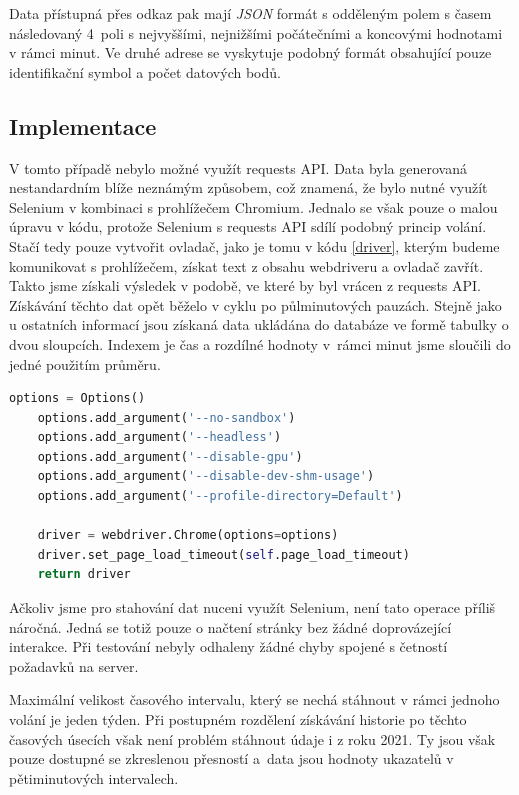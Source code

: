 Data přístupná přes odkaz pak mají \textit{JSON} formát s odděleným polem s časem následovaný 4~poli s nejvyššími, nejnižšími počátečními a koncovými hodnotami v rámci minut. 
Ve druhé adrese se vyskytuje podobný formát obsahující pouze identifikační symbol a počet datových bodů.

\subsection{Implementace}

V tomto případě nebylo možné využít requests API. 
Data byla generovaná nestandardním blíže neznámým způsobem, což znamená, že bylo nutné využít Selenium v kombinaci s prohlížečem Chromium. 
Jednalo se však pouze o malou úpravu v kódu, protože Selenium s requests API sdílí podobný princip volání. 
Stačí tedy pouze vytvořit ovladač, jako je tomu v kódu \ref{driver}, kterým budeme komunikovat s prohlížečem, získat text z obsahu webdriveru a ovladač zavřít. 
Takto jsme získali výsledek v podobě, ve které by byl vrácen z requests API. 
Získávání těchto dat opět běželo v cyklu po půlminutových pauzách. 
Stejně jako u ostatních informací jsou získaná data ukládána do databáze ve formě tabulky o dvou sloupcích. 
Indexem je čas a rozdílné hodnoty v~rámci minut jsme sloučili do jedné použitím průměru.

\begin{lstlisting}[caption={~Selenium ovladač},label=driver,captionpos=t,float,abovecaptionskip=-\medskipamount,belowcaptionskip=\medskipamount,language=Python]
    options = Options()    
    options.add_argument('--no-sandbox')
    options.add_argument('--headless')
    options.add_argument('--disable-gpu')
    options.add_argument('--disable-dev-shm-usage')
    options.add_argument('--profile-directory=Default')

    driver = webdriver.Chrome(options=options)
    driver.set_page_load_timeout(self.page_load_timeout)
    return driver
\end{lstlisting}

Ačkoliv jsme pro stahování dat nuceni využít Selenium, není tato operace příliš náročná. 
Jedná se totiž pouze o načtení stránky bez žádné doprovázející interakce. 
Při testování nebyly odhaleny žádné chyby spojené s četností požadavků na server. 

Maximální velikost časového intervalu, který se nechá stáhnout v rámci jednoho volání je jeden týden. 
Při postupném rozdělení získávání historie po těchto časových úsecích však není problém stáhnout údaje i z roku 2021. 
Ty jsou však pouze dostupné se zkreslenou přesností a~data jsou hodnoty ukazatelů v pětiminutových intervalech.

